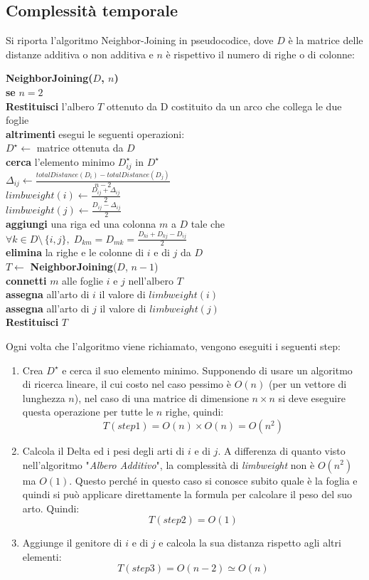 \newpage
\subsection{Complessità temporale}
Si riporta l'algoritmo Neighbor-Joining in pseudocodice, dove $D$ è la matrice delle distanze additiva o non additiva e $n$ è rispettivo il numero di righe o di colonne:
\begin{framed}\noindent
  \textbf{NeighborJoining($D$, $n$)}\\
  \textbf{se} $n=2$\\
  \indent \textbf{Restituisci} l'albero $T$ ottenuto da D costituito da un arco che collega le due foglie\\
  \textbf{altrimenti} esegui le seguenti operazioni: \\
  $D^\star \leftarrow $ matrice ottenuta da $D$\\
  \textbf{cerca} l'elemento minimo $D^\star_{ij}$ in $D^\star$\\
  $\Delta_{ij} \leftarrow \frac{totalDistance(D_i)-totalDistance(D_j)}{n-2}$\\
  $ limbweight(i) \leftarrow \frac{D_{ij}+\Delta_{ij}}{2}  $ \\
  $ limbweight(j) \leftarrow \frac{D_{ij}-\Delta_{ij}}{2}  $ \\
  \textbf{aggiungi} una riga ed una colonna $m$ a $D$  tale che $\forall k\in D\setminus \, \{i,j\}, \; D_{km}=D_{mk}=\frac{D_{ki}+D_{kj}-D_{ij}}{2}$\\
  \textbf{elimina} la righe e le colonne di $i$ e di $j$ da $D$\\
  $T \leftarrow$ \textbf{NeighborJoining}($D$, $n-1$) \\
  \textbf{connetti} $m$ alle foglie $i$ e $j$ nell'albero $T$ \\
  \textbf{assegna} all'arto di $i$ il valore di $limbweight(i)$\\
  \textbf{assegna} all'arto di $j$ il valore di $limbweight(j)$\\
  \textbf{Restituisci} $T$
\end{framed}
Ogni volta che l'algoritmo viene richiamato, vengono eseguiti i seguenti step:
\begin{enumerate}
	\item Crea $D^\star$ e cerca il suo elemento minimo. Supponendo di usare un algoritmo di ricerca lineare, il cui costo nel caso pessimo è $O(n)$ (per un vettore di lunghezza $n$), nel caso di una matrice di dimensione $n \times n$ si deve eseguire questa operazione per tutte le $n$ righe, quindi:
	\[T(step1)=O(n) \times O(n)=O(n^2)\]
	\item Calcola il Delta ed i pesi degli arti di $i$ e di $j$. A differenza di quanto visto nell'algoritmo "\textit{Albero Additivo}", la complessità di \textit{limbweight} non è $O(n^2)$ ma $O(1)$. Questo perché in questo caso si conosce subito quale è la foglia e quindi si può applicare direttamente la formula per calcolare il peso del suo arto. Quindi:
	\[T(step2)=O(1)\]
	\item Aggiunge il genitore di $i$ e di $j$ e calcola la sua distanza rispetto agli altri elementi:
	\[T(step3)=O(n-2)\simeq O(n)\] 
\end{enumerate}

